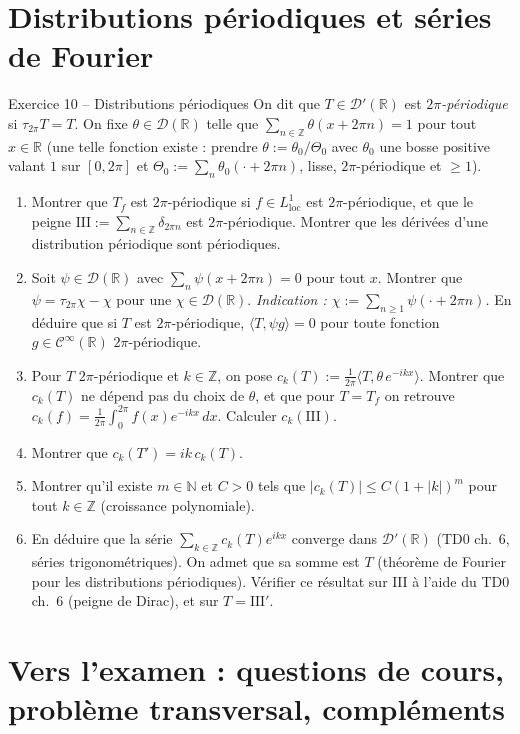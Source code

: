 \documentclass[11pt,a4paper]{article}
\newcommand{\R}{\mathbb{R}}
\newcommand{\N}{\mathbb{N}}
\newcommand{\Z}{\mathbb{Z}}
\newcommand{\Cinf}{\mathcal{C}^\infty}
\newcommand{\D}{\mathcal{D}}
\newcommand{\Sha}{\mathrm{III}}
\theoremstyle{definition}
\begin{document}
\section*{Distributions périodiques et séries de Fourier}

\begin{exo}{Exercice 10 -- Distributions périodiques}
On dit que $T\in\D'(\R)$ est \emph{$2\pi$-périodique} si $\tau_{2\pi}T=T$. On fixe $\theta\in\D(\R)$ telle que $\sum_{n\in\Z}\theta(x+2\pi n)=1$ pour tout $x\in\R$ (une telle fonction existe : prendre $\theta:=\theta_0/\Theta_0$ avec $\theta_0$ une bosse positive valant $1$ sur $[0,2\pi]$ et $\Theta_0:=\sum_n\theta_0(\cdot+2\pi n)$, lisse, $2\pi$-périodique et $\ge1$).
\begin{enumerate}[label=(\alph*)]
  \item Montrer que $T_f$ est $2\pi$-périodique si $f\in L^1_{\mathrm{loc}}$ est $2\pi$-périodique, et que le peigne $\Sha:=\sum_{n\in\Z}\delta_{2\pi n}$ est $2\pi$-périodique. Montrer que les dérivées d'une distribution périodique sont périodiques.
  \item Soit $\psi\in\D(\R)$ avec $\sum_n\psi(x+2\pi n)=0$ pour tout $x$. Montrer que $\psi=\tau_{2\pi}\chi-\chi$ pour une $\chi\in\D(\R)$. \emph{Indication : $\chi:=\sum_{n\ge1}\psi(\cdot+2\pi n)$.} En déduire que si $T$ est $2\pi$-périodique, $\langle T,\psi g\rangle=0$ pour toute fonction $g\in\Cinf(\R)$ $2\pi$-périodique.
  \item Pour $T$ $2\pi$-périodique et $k\in\Z$, on pose $c_k(T):=\frac1{2\pi}\langle T,\theta\,e^{-ikx}\rangle$. Montrer que $c_k(T)$ ne dépend pas du choix de $\theta$, et que pour $T=T_f$ on retrouve $c_k(f)=\frac1{2\pi}\int_0^{2\pi}f(x)e^{-ikx}\,dx$. Calculer $c_k(\Sha)$.
  \item Montrer que $c_k(T')=ik\,c_k(T)$.
  \item Montrer qu'il existe $m\in\N$ et $C>0$ tels que $|c_k(T)|\le C(1+|k|)^m$ pour tout $k\in\Z$ (croissance polynomiale).
  \item En déduire que la série $\sum_{k\in\Z}c_k(T)e^{ikx}$ converge dans $\D'(\R)$ (TD0 ch.~6, séries trigonométriques). On admet que sa somme est $T$ (théorème de Fourier pour les distributions périodiques). Vérifier ce résultat sur $\Sha$ à l'aide du TD0 ch.~6 (peigne de Dirac), et sur $T=\Sha'$.
\end{enumerate}
\end{exo}

\section*{Vers l'examen : questions de cours, problème transversal, compléments}
\end{document}
